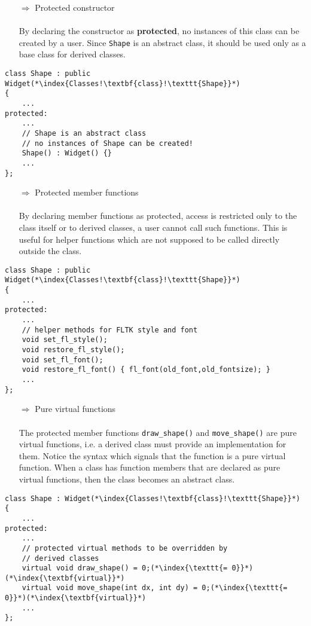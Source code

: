 \documentclass[10pt]{article}
\begin{document}
\begin{enumerate}
\item[$\Rightarrow$] Protected constructor\\ \\ By declaring the constructor as \textbf{protected}, no instances of this class can be created by a user. Since \texttt{Shape} is an abstract class, it should be used only as a base class for derived classes.
\end{enumerate}
\begin{lstlisting}
class Shape : public Widget(*\index{Classes!\textbf{class}!\texttt{Shape}}*)
{
    ...
protected:
    ...
    // Shape is an abstract class
    // no instances of Shape can be created!
    Shape() : Widget() {}
    ...
};
\end{lstlisting}
\begin{enumerate}
\item[$\Rightarrow$] Protected member functions\\ \\ By declaring member functions as protected, access is restricted only to the class itself or to derived classes, a user cannot call such functions. This is useful for helper functions which are not supposed to be called directly outside the class.
\end{enumerate}
\begin{lstlisting}
class Shape : public Widget(*\index{Classes!\textbf{class}!\texttt{Shape}}*)
{
    ...
protected:
    ...
    // helper methods for FLTK style and font
    void set_fl_style();
    void restore_fl_style();
    void set_fl_font();
    void restore_fl_font() { fl_font(old_font,old_fontsize); }
    ...
};
\end{lstlisting}
\begin{enumerate}
\item[$\Rightarrow$] Pure virtual functions\\ \\ The protected member functions \texttt{draw\_shape()} and \texttt{move\_shape()} are pure virtual functions, i.e. a derived class must provide an implementation for them. Notice the syntax  which signals that the function is a pure virtual function. When a class has function members that are declared as pure virtual functions, then the class becomes an abstract class.
\end{enumerate}
\begin{lstlisting}
class Shape : Widget(*\index{Classes!\textbf{class}!\texttt{Shape}}*)
{
    ...
protected:
    ...
    // protected virtual methods to be overridden by 
    // derived classes
    virtual void draw_shape() = 0;(*\index{\texttt{= 0}}*)(*\index{\textbf{virtual}}*)
    virtual void move_shape(int dx, int dy) = 0;(*\index{\texttt{= 0}}*)(*\index{\textbf{virtual}}*)
    ...
};
\end{lstlisting}
\end{document}

